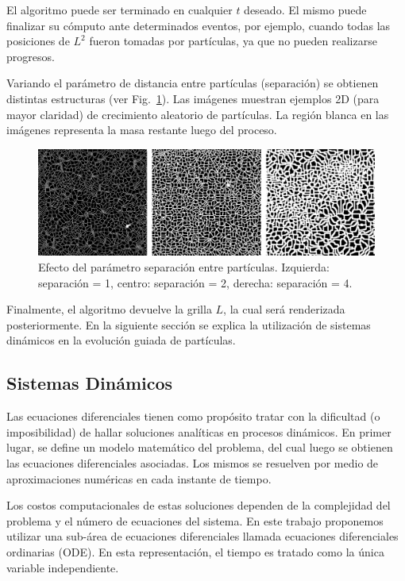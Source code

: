 El algoritmo puede ser terminado en cualquier $t$ deseado. El mismo puede finalizar su c\'omputo ante determinados eventos, por ejemplo, cuando todas las posiciones de $L^{2}$ fueron tomadas por part\'iculas, ya que no pueden realizarse progresos.

Variando el par\'ametro de distancia entre part\'iculas (separación) se obtienen distintas estructuras (ver Fig.~\ref{fg:sistdin1}). Las im\'agenes muestran ejemplos 2D (para mayor claridad) de crecimiento aleatorio de part\'iculas. La regi\'on blanca en las im\'agenes representa la masa restante luego del proceso.


\begin{figure}[htb!]
  \centerline{\includegraphics[width=13cm]{sistdin1}}
  \caption[Efecto del parámetro separación entre partículas.]{Efecto del parámetro separación entre partículas. Izquierda: separaci\'on = 1, centro: separaci\'on = 2, derecha: separaci\'on = 4.}
  \label{fg:sistdin1}
\end{figure}

Finalmente, el algoritmo devuelve la grilla $L$, la cual ser\'a renderizada posteriormente. En la siguiente secci\'on se explica la utilizaci\'on de sistemas din\'amicos en la evoluci\'on guiada de part\'iculas.

\subsection{Sistemas Din\'amicos}

Las ecuaciones diferenciales tienen como prop\'osito tratar con la dificultad (o imposibilidad) de hallar soluciones anal\'iticas en procesos din\'amicos. En primer lugar, se define un modelo matem\'atico del problema, del cual luego se obtienen 
las ecuaciones diferenciales asociadas. Los mismos se resuelven por medio de aproximaciones num\'ericas en cada instante de tiempo.

Los costos computacionales de estas soluciones dependen de la complejidad del problema y el n\'umero de ecuaciones del sistema. En este trabajo proponemos utilizar una sub-\'area de ecuaciones diferenciales llamada ecuaciones diferenciales ordinarias (ODE). En esta representaci\'on, el tiempo es tratado como la \'unica variable independiente.


